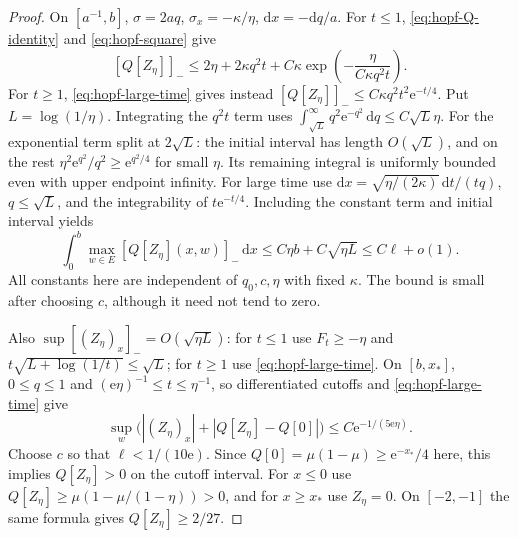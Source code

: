 \begin{proof}
On $[a^{-1},b]$, $\sigma=2aq$, $\sigma_x=-\kappa/\eta$,
$\mathrm dx=-\mathrm dq/a$. For $t\leq1$, \eqref{eq:hopf-Q-identity} and
\eqref{eq:hopf-square} give
\[
 [Q[Z_\eta]]_-\leq
 2\eta+2\kappa q^2t+C\kappa\exp\left(-\frac\eta{C\kappa q^2t}\right).
\]
For $t\geq1$, \eqref{eq:hopf-large-time} gives instead
$[Q[Z_\eta]]_-\leq C\kappa q^2t^2\mathrm e^{-t/4}$.
Put $L=\log(1/\eta)$. Integrating the $q^2t$ term uses
$\int_{\sqrt L}^\infty q^2\mathrm e^{-q^2}\,\mathrm dq\leq C\sqrt L\eta$.
For the exponential term split at $2\sqrt L$: the initial interval has
length $O(\sqrt L)$, and on the rest
$\eta^2\mathrm e^{q^2}/q^2\geq\mathrm e^{q^2/4}$ for small $\eta$.
Its remaining integral is uniformly bounded even with upper endpoint infinity.
For large time use
$\mathrm dx=\sqrt{\eta/(2\kappa)}\,\mathrm dt/(tq)$,
$q\leq\sqrt L$, and the integrability of $t\mathrm e^{-t/4}$.
Including the constant term and initial interval yields
\begin{equation}\label{eq:rotational-integrated-defect}
 \int_0^b\max_{w\in E}[Q[Z_\eta](x,w)]_-\,\mathrm dx
       \leq C\eta b+C\sqrt{\eta L}\leq C\ell+o(1).
\end{equation}
All constants here are independent of $q_0,c,\eta$ with fixed $\kappa$.
The bound is small after choosing $c$, although it need not tend to zero.

Also $\sup[(Z_\eta)_x]_-=O(\sqrt{\eta L})$:
for $t\leq1$ use $F_t\geq-\eta$ and
$t\sqrt{L+\log(1/t)}\leq\sqrt L$; for $t\geq1$ use \eqref{eq:hopf-large-time}.
On $[b,x_*]$, $0\leq q\leq1$ and $(\mathrm e\eta)^{-1}\leq t\leq\eta^{-1}$,
so differentiated cutoffs and \eqref{eq:hopf-large-time} give
\[
 \sup_w\bigl(|(Z_\eta)_x|+|Q[Z_\eta]-Q[0]|\bigr)
       \leq C\mathrm e^{-1/(5\mathrm e\eta)}.
\]
Choose $c$ so that $\ell<1/(10\mathrm e)$. Since
$Q[0]=\mu(1-\mu)\geq\mathrm e^{-x_*}/4$ here, this implies $Q[Z_\eta]>0$
on the cutoff interval. For $x\leq0$ use
$Q[Z_\eta]\geq\mu(1-\mu/(1-\eta))>0$, and for $x\geq x_*$ use $Z_\eta=0$.
On $[-2,-1]$ the same formula gives $Q[Z_\eta]\geq2/27$.


\end{proof}
